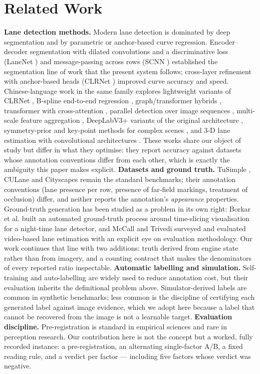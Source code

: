 \documentclass[journal]{IEEEtran}
\begin{document}
\section{Related Work}
\textbf{Lane detection methods.} Modern lane detection is dominated by deep segmentation and by
parametric or anchor-based curve regression. Encoder--decoder segmentation with dilated convolutions
and a discriminative loss (LaneNet \cite{neven2018lanenet}) and message-passing across rows (SCNN
\cite{pan2018scnn}) established the segmentation line of work that the present system follows;
cross-layer refinement with anchor-based heads (CLRNet \cite{zheng2022clrnet}) improved curve accuracy
and speed. Chinese-language work in the same family explores lightweight variants of CLRNet
\cite{chen2026clrnetlight}, B-spline end-to-end regression \cite{huang2026bspline}, graph/transformer hybrids
\cite{jia2026gnn}, transformer with cross-attention \cite{li2026xca}, parallel detection over image
sequences \cite{zhu2024parallel}, multi-scale feature aggregation \cite{hu2026multiscale}, DeepLabV3+
variants \cite{shuai2026deeplab} of the original architecture \cite{chen2018deeplab}, symmetry-prior and key-point methods for complex scenes
\cite{lu2026symmetry}, and 3-D lane estimation with convolutional architectures \cite{chen2025threed}.
These works share our object of study but differ in what they optimise: they report accuracy against
datasets whose annotation conventions differ from each other, which is exactly the ambiguity this
paper makes explicit.
\textbf{Datasets and ground truth.} TuSimple \cite{tusimple2017}, CULane \cite{pan2018scnn} and Cityscapes \cite{cordts2016cityscapes} remain the
standard benchmarks; their annotation conventions (lane presence per row, presence of far-field
markings, treatment of occlusion) differ, and neither reports the annotation's \emph{appearance}
properties. Ground-truth generation has been studied as a problem in its own right: Borkar et al.
\cite{borkar2012groundtruth} built an automated ground-truth process around time-slicing visualisation
for a night-time lane detector, and McCall and Trivedi \cite{mccall2006video} surveyed and evaluated
video-based lane estimation with an explicit eye on evaluation methodology. Our work continues that
line with two additions: truth derived from engine state rather than from imagery, and a counting
contract that makes the denominators of every reported ratio inspectable.
\textbf{Automatic labelling and simulation.} Self-training and auto-labelling are widely used to reduce
annotation cost, but their evaluation inherits the definitional problem above. Simulator-derived
labels are common in synthetic benchmarks; less common is the discipline of certifying each
generated label against image evidence, which we adopt here because a label that cannot be
recovered from the image is not a learnable target.
\textbf{Evaluation discipline.} Pre-registration is standard in empirical sciences and rare in perception
research. Our contribution here is not the concept but a worked, fully recorded instance: a
pre-registration, an alternating single-factor A/B, a fixed reading rule, and a verdict per factor ---
including five factors whose verdict was negative.
\end{document}
